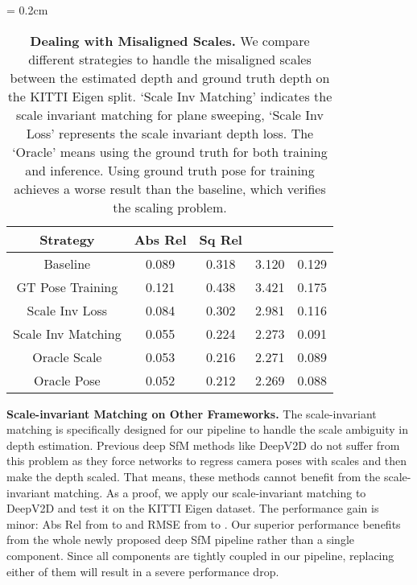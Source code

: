 \documentclass[final]{cvpr}
\begin{document}
\begin{table}[htb]
\footnotesize
\tabcolsep = 0.2cm
\centering
\caption{\small{\textbf{Dealing with Misaligned Scales.} We compare different strategies to handle the misaligned scales between the estimated depth and ground truth depth on the KITTI Eigen split. `Scale Inv Matching' indicates the scale invariant matching for plane sweeping, `Scale Inv Loss' represents the scale invariant depth loss. The `Oracle' means using the ground truth for both training and inference. Using ground truth pose for training achieves a worse result than the baseline, which verifies the scaling problem. }  } 
\begin{tabular}{ c | c | c | c |c }
\hline
 Strategy & Abs Rel & Sq Rel &  &    \\
 \hline
Baseline  & 0.089&0.318& 3.120& 0.129 \\
GT Pose Training  &0.121&0.438&3.421&0.175\\
Scale Inv Loss & 0.084&0.302& 2.981& 0.116 \\
Scale Inv Matching  & 0.055&0.224&2.273 &0.091 \\
\hline
Oracle Scale  &   0.053&0.216&2.271&0.089 \\
Oracle Pose  & 0.052&0.212&2.269&0.088 \\
\hline
\end{tabular}\label{tab:ab_depth_scale_inv_or_not}
\vspace{-2mm}
\end{table}










\textbf{Scale-invariant Matching on Other Frameworks.}
The scale-invariant matching is specifically designed for our pipeline to handle the scale ambiguity in depth estimation. Previous deep SfM methods like DeepV2D do not suffer from this problem as they force networks to regress camera poses with scales and then make the depth scaled. That means, these methods cannot benefit from the scale-invariant matching. As a proof, we apply our scale-invariant matching to DeepV2D and test it on the KITTI Eigen dataset. The performance gain is minor: Abs Rel from  to  and RMSE from  to . Our superior performance benefits from the whole newly proposed deep SfM pipeline rather than a single component. Since all components are tightly coupled in our pipeline, replacing either of them will result in a severe performance drop.
\end{document}
